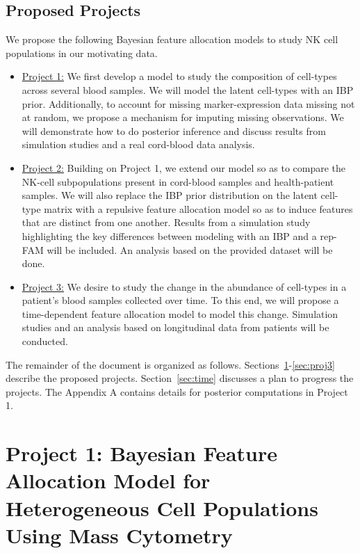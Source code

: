 \documentclass[12pt,]{article}
\begin{document}
\subsection{Proposed Projects}
We propose the following Bayesian feature allocation models to study NK cell
populations in our motivating data.
\begin{itemize}
\item \underline{Project 1:}
We first develop a model to study the composition of cell-types across several
blood samples. We will model the latent cell-types with an IBP prior.
Additionally, to account for missing marker-expression data missing not at
random, we propose a mechanism for imputing missing observations. We will
demonstrate how to do posterior inference and discuss results from simulation
studies and a real cord-blood data analysis.

\item \underline{Project 2:}
Building on Project 1, we extend our model so as to compare the NK-cell
subpopulations present in cord-blood samples and health-patient samples.
We will also replace the IBP prior distribution on the latent cell-type
matrix with a repulsive feature allocation model so as to induce 
features that are distinct from one another. Results from a simulation study
highlighting the key differences between modeling with an IBP and a rep-FAM
will be included. An analysis based on the provided dataset will be done.

\item \underline{Project 3:}
We desire to study the change in the abundance of cell-types in a patient's
blood samples collected over time. To this end, we will propose a
time-dependent feature allocation model to model this change. Simulation
studies and an analysis based on longitudinal data from patients will be
conducted.

\end{itemize} 
The remainder of the document is organized as follows.
Sections~\ref{sec:proj1}-\ref{sec:proj3} describe the proposed projects.
Section~\ref{sec:time} discusses a plan to progress the projects.  
The Appendix A contains details for posterior computations in Project 1.


\section{Project 1: Bayesian Feature Allocation Model for Heterogeneous Cell Populations Using Mass Cytometry}\label{sec:proj1}
\end{document}
